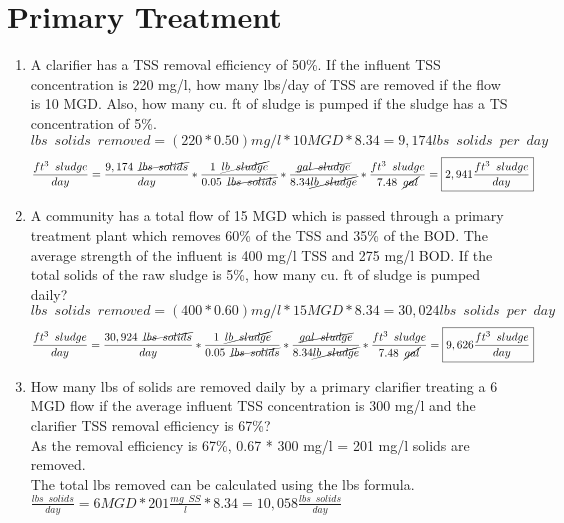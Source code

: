 \section*{Primary Treatment} 
\begin{enumerate}
\item A clarifier has a TSS removal efficiency of 50\%.  If the influent TSS concentration is 220 mg/l, how many lbs/day of TSS are removed if the flow is 10 MGD.  Also, how many cu. ft of sludge is pumped if the sludge has a TS concentration of 5\%.\\
$lbs \enspace solids \enspace removed=(220*0.50)mg/l*10MGD*8.34=9,174lbs \enspace solids \enspace per \enspace day$
$$\frac{ft^3\enspace sludge}{day}= \frac{9,174 \enspace \cancel{lbs \enspace solids}}{day} * \frac{1 \enspace \cancel{lb \enspace sludge}}{0.05\enspace \cancel{lbs \enspace solids}}*\frac{\cancel{gal \enspace sludge}}{8.34\cancel{lb \enspace sludge}}*\frac{ft^3 \enspace sludge}{7.48 \enspace \cancel{gal}}=\boxed{2,941\frac{ft^3 \enspace sludge}{day}} $$

\item A community has a total flow of 15 MGD which is passed through a primary treatment plant which removes 60\% of the TSS and 35\% of the BOD. The average strength of the influent is 400 mg/l TSS and 275 mg/l BOD. If the total solids of the raw sludge is 5\%, how many cu. ft of sludge is pumped daily?
$lbs \enspace solids \enspace removed=(400*0.60)mg/l*15MGD*8.34=30,024lbs \enspace solids \enspace per \enspace day$
$$\frac{ft^3\enspace sludge}{day}= \frac{30,924 \enspace \cancel{lbs \enspace solids}}{day} * \frac{1 \enspace \cancel{lb \enspace sludge}}{0.05\enspace \cancel{lbs \enspace solids}}*\frac{\cancel{gal \enspace sludge}}{8.34\cancel{lb \enspace sludge}}*\frac{ft^3 \enspace sludge}{7.48 \enspace \cancel{gal}}=\boxed{9,626\frac{ft^3 \enspace sludge}{day}} $$

\item How many lbs of solids are removed daily by a primary clarifier treating a 6 MGD flow if the average influent TSS concentration is 300 mg/l and the clarifier TSS removal efficiency is 67\%?\\
As the removal efficiency is 67\%, 0.67 * 300 mg/l = 201 mg/l solids are removed.\\
The total lbs removed can be calculated using the lbs formula.\\
$ \frac{lbs \enspace solids}{day}= 6 MGD* 201  \frac{mg \enspace  SS}{l}*8.34=\boxed{10,058 \frac{lbs \enspace solids}{day}}$


\end{enumerate}
